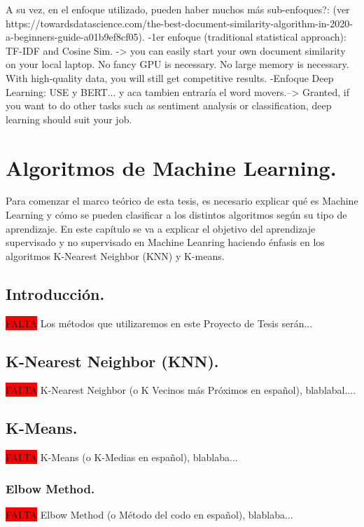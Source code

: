 \documentclass[12pt,a4paper]{article}
\begin{document}
A su vez, en el enfoque utilizado, pueden haber muchos más sub-enfoques?: (ver https://towardsdatascience.com/the-best-document-similarity-algorithm-in-2020-a-beginners-guide-a01b9ef8cf05).
            -1er enfoque (traditional statistical approach): TF-IDF and Cosine Sim. -> you can easily start your own document similarity on your local laptop. No fancy GPU is necessary. No large memory is                 necessary. With high-quality data, you will still get competitive results.
            -Enfoque Deep Learning: USE y  BERT... y aca tambien entraría el word movers.--> Granted, if you want to do other tasks such as sentiment analysis or classification, deep learning should suit your job.


\cleardoublepage

\section{Algoritmos de Machine Learning.}\label{3.AlgoritmosdeMachineLearning}

Para comenzar el marco teórico de esta tesis, es necesario explicar qué es Machine Learning y cómo se pueden clasificar a los distintos algoritmos según su tipo de aprendizaje. 
En este capítulo se va a explicar el objetivo del aprendizaje supervisado y no supervisado en Machine Leanring haciendo énfasis en los algoritmos K-Nearest Neighbor (KNN) y K-means.

\subsection{Introducción.}
\colorbox{red}{FALTA}
Los métodos que utilizaremos en este Proyecto de Tesis serán...

\subsection{K-Nearest Neighbor (KNN).}
\colorbox{red}{FALTA}
K-Nearest Neighbor (o K Vecinos más Próximos en español), blablabal....

\cleardoublepage

\subsection{K-Means.}
\colorbox{red}{FALTA}
K-Means (o K-Medias en español), blablaba...

\cleardoublepage

\subsubsection{Elbow Method.}
\colorbox{red}{FALTA}
Elbow Method (o Método del codo en español), blablaba...
\end{document}
